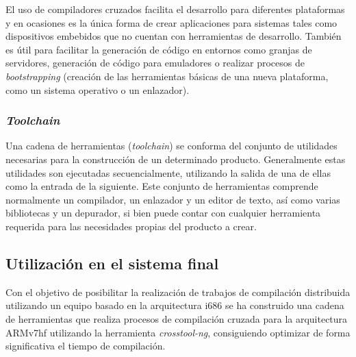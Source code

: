 El uso de compiladores cruzados facilita el desarrollo para diferentes plataformas y en ocasiones es la única forma de crear aplicaciones para sistemas tales como dispositivos embebidos que no cuentan con herramientas de desarrollo. También es útil para facilitar la generación de código en entornos como granjas de servidores, generación de código para emuladores o realizar procesos de \textit{bootstrapping} (creación de las herramientas básicas de una nueva plataforma, como un sistema operativo o un enlazador).


\subsubsection{\textit{Toolchain}}

Una cadena de herramientas (\textit{toolchain}) se conforma del conjunto de utilidades necesarias para la construcción de un determinado producto. Generalmente estas utilidades son ejecutadas secuencialmente, utilizando la salida de una de ellas como la entrada de la siguiente. Este conjunto de herramientas comprende normalmente un compilador, un enlazador y un editor de texto, así como varias bibliotecas y un depurador, si bien puede contar con cualquier herramienta requerida para las necesidades propias del producto a crear.

\subsection{Utilización en el sistema final}
Con el objetivo de posibilitar la realización de trabajos de compilación distribuida utilizando un equipo basado en la arquitectura i686 %
se ha construido una cadena de herramientas que realiza procesos de compilación cruzada para la arquitectura ARMv7hf utilizando la herramienta \textit{crosstool-ng}\citationneeded, consiguiendo optimizar de forma significativa el tiempo de compilación.


